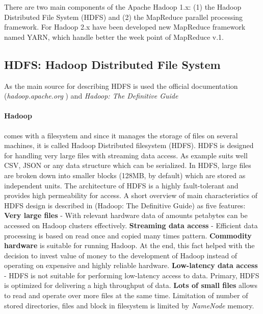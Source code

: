 \documentclass[a4paper,12pt,oneside]{report}
\begin{document}
	
	There are two main components of the Apache Hadoop 1.x: (1) the Hadoop
	Distributed File System 
	(HDFS) and (2) the MapReduce parallel processing framework. 	
	For Hadoop 2.x have been developed new MapReduce 
	framework named YARN, which handle better the week point of MapReduce v.1.
	
	
	\subsection{HDFS: Hadoop Distributed File System}\label{subsec:hdfs}
	As the main source for describing HDFS is used the official documentation
	(\textit{hadoop.apache.org} 
	\cite{hadoop_web}) and  \textit{Hadoop: The Definitive
		Guide}\cite{hadoop_definitive}
	
	\paragraph*{Hadoop} comes with a filesystem and since it manages the storage of
	files on several 
	machines, it is called Hadoop Distributed filesystem (HDFS). 
	HDFS is designed for handling very large files with streaming
	data access. As example suits well CSV, JSON or any data structure which can be
	serialized. \cite{hadoop_hdfs_web} In HDFS, large files are broken down into
	smaller blocks (128MB, by default) which are 
	stored as independent units. The architecture of HDFS is a highly fault-tolerant
	and provides high permeability for access.   
	A short overview of main characteristics of HDFS design is described in
	(Hadoop: The Definitive 
	Guide\cite{hadoop_definitive}) as five features: \textbf{Very large files} -
	With relevant hardware data of amounts petabytes 
	can be accessed on Hadoop clusters effectively. \textbf{Streaming data access} -
	Efficient data processing is based on
	read once and copied many times pattern. \textbf{Commodity hardware} is
	suitable for running Hadoop. At the end,
	this fact helped with the decision to invest value of money to the development
	of Hadoop instead 
	of operating on expensive and highly reliable hardware. \textbf{Low-latency
		data access} - HDFS is not suitable for performing
	low-latency access to data. Primary, HDFS is optimized for delivering
	a high throughput of data. \textbf{Lots of small files} allows to read and
	operate over more files
	at the same time. Limitation of number of stored directories,  files and block
	in filesystem is limited by \emph{NameNode} memory.
	
\end{document}
